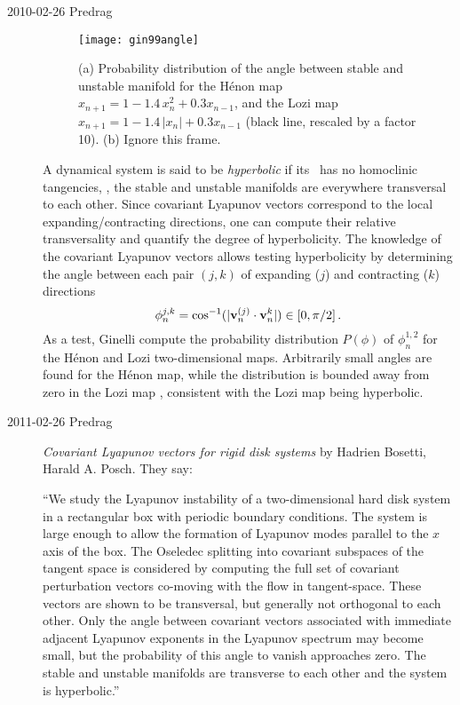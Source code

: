 \begin{description}

\item[2010-02-26 Predrag]
%
\begin{figure}
\begin{center}
\texttt{[image: gin99angle]}
\end{center}
\caption{
(a) Probability distribution of the angle between stable and
unstable manifold for the H\'enon map $x_{n+1} = 1 -1.4\,
x_n^2 + 0.3 x_{n-1}$, and the Lozi map $x_{n+1} = 1
-1.4\,|x_n| + 0.3 x_{n-1}$ (black line, rescaled by a factor
10). (b) Ignore this frame.
}
\label{fig:gin99angle} %
\end{figure}
%

A dynamical system is said to be \emph{hyperbolic} if its
\statesp\ has no homoclinic tangencies, \ie, the stable and
unstable manifolds are everywhere transversal to each other.
Since covariant Lyapunov vectors correspond to the local
expanding/contracting directions, one can compute their
relative transversality and quantify the degree of hyperbolicity.
The knowledge of the covariant Lyapunov vectors allows testing hyperbolicity by
determining the angle between each pair $(j,k)$ of expanding
($j$) and contracting ($k$) directions
\[
\phi_n^{j,k} = \cos^{-1}(|{\bf v}_n^{(j)} \cdot{\bf v}_n^k|) \in [0,\pi/2]
\,.
\]
As a test, Ginelli \etal{} compute the
probability distribution $P(\phi)$ of $\phi_n^{1,2}$ for the
H\'enon and Lozi two-dimensional maps. Arbitrarily small
angles are found for the H\'enon map, while the distribution
is bounded away from zero in the Lozi map ,
consistent with the Lozi map being hyperbolic.

\item[2011-02-26 Predrag]
{\em Covariant Lyapunov vectors for rigid disk systems}
by Hadrien Bosetti, Harald A. Posch. They say:

``We study the Lyapunov instability of a two-dimensional hard disk system
in a rectangular box with periodic boundary conditions. The system is
large enough to allow the formation of Lyapunov modes parallel to the $x$
axis of the box. The Oseledec splitting into covariant subspaces of the
tangent space is considered by computing the full set of covariant
perturbation vectors co-moving with the flow in tangent-space. These
vectors are shown to be transversal, but generally not orthogonal to each
other. Only the angle between covariant vectors associated with immediate
adjacent Lyapunov exponents in the Lyapunov spectrum may become small,
but the probability of this angle to vanish approaches zero. The stable
and unstable manifolds are transverse to each other and the system is
hyperbolic.''


\end{description}
